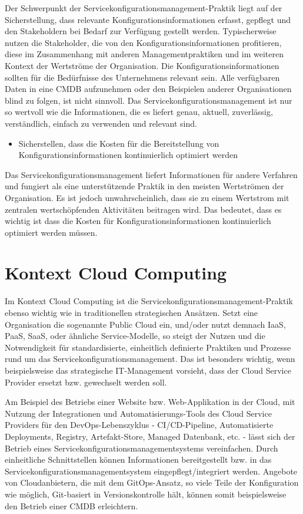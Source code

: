 \noindent
Der Schwerpunkt der Servicekonfigurationsmanagement-Praktik liegt auf der Sicherstellung, dass relevante Konfigurationsinformationen
erfasst, gepflegt und den Stakeholdern bei Bedarf zur Verfügung gestellt werden.
Typischerweise nutzen die Stakeholder, die von den Konfigurationsinformationen profitieren, diese im Zusammenhang mit anderen
Managementpraktiken und im weiteren Kontext der Wertströme der Organisation.
Die Konfigurationsinformationen sollten für die Bedürfnisse des Unternehmens relevant sein. Alle verfügbaren
Daten in eine CMDB aufzunehmen oder den Beispielen anderer Organisationen blind zu folgen, ist nicht sinnvoll. Das
Servicekonfigurationsmanagement ist nur so wertvoll wie die Informationen, die es liefert
genau, aktuell, zuverlässig, verständlich, einfach zu verwenden und relevant sind.

\begin{itemize}
	\item Sicherstellen, dass die Kosten für die Bereitstellung von Konfigurationsinformationen kontinuierlich optimiert werden
\end{itemize}

\noindent
Das Servicekonfigurationsmanagement liefert Informationen für andere Verfahren und fungiert als
eine unterstützende Praktik in den meisten Wertströmen der Organisation. Es ist jedoch unwahrscheinlich, dass sie
zu einem Wertstrom mit zentralen wertschöpfenden Aktivitäten beitragen wird. Das bedeutet, dass es wichtig ist
dass die Kosten für Konfigurationsinformationen kontinuierlich optimiert werden müssen.

\section{Kontext Cloud Computing}
Im Kontext Cloud Computing ist die Servicekonfigurationsmanagement-Praktik
ebenso wichtig wie in traditionellen strategischen Ansätzen.
Setzt eine Organisation die sogenannte Public Cloud ein, und/oder nutzt
demnach IaaS, PaaS, SaaS, oder ähnliche Service-Modelle, so steigt
der Nutzen und die Notwendigkeit für standardisierte, einheitlich definierte
Praktiken und Prozesse rund um das Servicekonfigurationsmanagement. 
Das ist besonders wichtig, wenn beispielsweise das strategische IT-Management
vorsieht, dass der Cloud Service Provider ersetzt bzw. gewechselt werden soll.

Am Beispiel des Betriebs einer Website bzw. Web-Applikation in der Cloud,
mit Nutzung der Integrationen und Automatisierungs-Tools des
Cloud Service Providers für den DevOps-Lebenszyklus - 
CI/CD-Pipeline, Automatisierte Deployments, Registry, 
Artefakt-Store, Managed Datenbank, etc. - lässt sich der Betrieb eines
Servicekonfigurationsmanagementsystems vereinfachen. Durch einheitliche
Schnittstellen können Informationen bereitgestellt bzw. in das 
Servicekonfigurationsmanagementsystem eingepflegt/integriert werden.
Angebote von Cloudanbietern, die mit dem GitOps-Ansatz,
so viele Teile der Konfiguration wie möglich, Git-basiert in Versionskontrolle
hält, können somit beispielsweise den Betrieb einer CMDB erleichtern.
